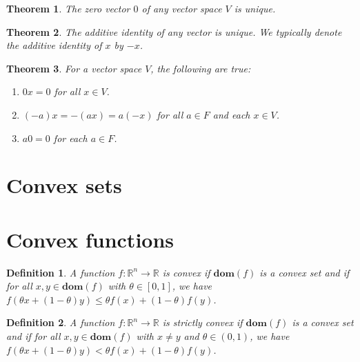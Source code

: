 \documentclass[a4paper]{article}
\newtheorem{mytheorem}{Theorem}
\newtheorem{mydef}{Definition}
\numberwithin{mytheorem}{section}
\numberwithin{mydef}{section}
\numberwithin{example}{section}
\begin{document}
\begin{mytheorem} The zero vector $0$ of any vector space $V$ is unique. \end{mytheorem}

\begin{mytheorem} The additive identity of any vector is unique. We typically denote the additive identity of $x$ by $-x$. \end{mytheorem}

\begin{mytheorem} For a vector space $V$, the following are true:
\begin{enumerate}
\item $0x = 0 $ for all $x \in V$.
\item $(-a)x = -(ax) = a(-x)$ for all $a \in F$ and each $x \in V$.
\item $a0 = 0$ for each $a \in F$. 
\end{enumerate}
\end{mytheorem}




\section{Convex sets}



\section{Convex functions}

\begin{mydef} A function $f : \mathbb{R}^{n} \rightarrow \mathbb{R} $ is convex if $\textbf{dom}(f)$ is a convex set and if for all $x,y \in \textbf{dom}(f)$ with $\theta \in [0,1]$, we have $f(\theta x + (1-\theta)y) \leq \theta f(x) + (1-\theta)f(y)$.  \end{mydef}

\begin{mydef} A function $f : \mathbb{R}^{n} \rightarrow \mathbb{R} $ is strictly convex if $\textbf{dom}(f)$ is a convex set and if for all $x,y \in \textbf{dom}(f)$ with $x \neq y$ and $\theta \in (0,1)$, we have $f(\theta x + (1-\theta)y) < \theta f(x) + (1-\theta)f(y)$.  \end{mydef}
\end{document}
